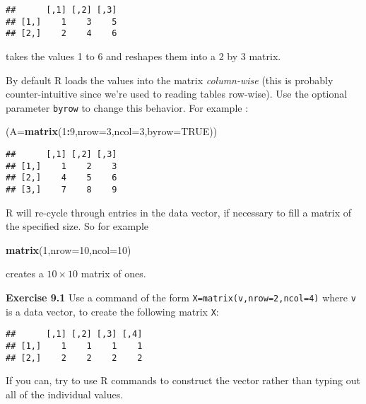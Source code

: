 \documentclass[11pt,]{article}
\newenvironment{Shaded}{\begin{snugshade}}{\end{snugshade}}
\newcommand{\KeywordTok}[1]{\textcolor[rgb]{0.13,0.29,0.53}{\textbf{#1}}}
\newcommand{\DataTypeTok}[1]{\textcolor[rgb]{0.13,0.29,0.53}{#1}}
\newcommand{\DecValTok}[1]{\textcolor[rgb]{0.00,0.00,0.81}{#1}}
\newcommand{\OtherTok}[1]{\textcolor[rgb]{0.56,0.35,0.01}{#1}}
\newcommand{\OperatorTok}[1]{\textcolor[rgb]{0.81,0.36,0.00}{\textbf{#1}}}
\newcommand{\NormalTok}[1]{#1}
\begin{document}
\begin{verbatim}
##      [,1] [,2] [,3]
## [1,]    1    3    5
## [2,]    2    4    6
\end{verbatim}

takes the values 1 to 6 and reshapes them into a 2 by 3 matrix.

By default R loads the values into the matrix \emph{column-wise} (this
is probably counter-intuitive since we're used to reading tables
row-wise). Use the optional parameter \texttt{byrow} to change this
behavior. For example :

\begin{Shaded}
\begin{Highlighting}[]
\NormalTok{(}\DataTypeTok{A=}\KeywordTok{matrix}\NormalTok{(}\DecValTok{1}\OperatorTok{:}\DecValTok{9}\NormalTok{,}\DataTypeTok{nrow=}\DecValTok{3}\NormalTok{,}\DataTypeTok{ncol=}\DecValTok{3}\NormalTok{,}\DataTypeTok{byrow=}\OtherTok{TRUE}\NormalTok{))}
\end{Highlighting}
\end{Shaded}

\begin{verbatim}
##      [,1] [,2] [,3]
## [1,]    1    2    3
## [2,]    4    5    6
## [3,]    7    8    9
\end{verbatim}

R will re-cycle through entries in the data vector, if necessary to fill
a matrix of the specified size. So for example

\begin{Shaded}
\begin{Highlighting}[]
\KeywordTok{matrix}\NormalTok{(}\DecValTok{1}\NormalTok{,}\DataTypeTok{nrow=}\DecValTok{10}\NormalTok{,}\DataTypeTok{ncol=}\DecValTok{10}\NormalTok{)}
\end{Highlighting}
\end{Shaded}

creates a \(10 \times 10\) matrix of ones.

\textbf{Exercise 9.1} Use a command of the form
\texttt{X=matrix(v,nrow=2,ncol=4)} where \texttt{v} is a data vector, to
create the following matrix \texttt{X}:

\begin{verbatim}
##      [,1] [,2] [,3] [,4]
## [1,]    1    1    1    1
## [2,]    2    2    2    2
\end{verbatim}

If you can, try to use R commands to construct the vector rather than
typing out all of the individual values.
\end{document}
